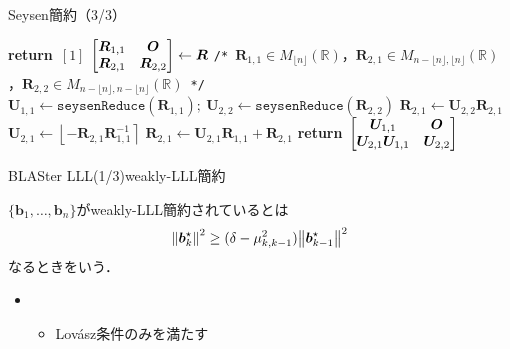 \documentclass[12pt,aspectratio=169,table,dvipdfmx, leqno]{beamer}
\renewcommand{\Comment}[1]{\quad\texttt{/*}~#1~\texttt{*/}}
\newcommand{\round}[1]{\left\lfloor #1 \right\rceil}
\begin{document}
\begin{frame}{Seysen簡約（3/3）}
\begin{algorithm}[H]
    \footnotesize
    \begin{algorithmic}[1]
        \caption{\footnotesize Seysen簡約\cite{DPS25}}
        \label{alg_seysen}
            \State \textbf{return}~$[1]$
        \EndIf
        \State $\mqty[\bm{R}_{1, 1} & \bm{O}\\ \bm{R}_{2, 1} & \bm{R}_{2, 2}]\gets \bm{R}$ \Comment{$\bm{R}_{1, 1}\in M_{\lfloor n\rfloor}(\mathbb{R})$，$\bm{R}_{2, 1}\in M_{n-\lfloor n\rfloor, \lfloor n\rfloor}(\mathbb{R})$，$\bm{R}_{2, 2}\in M_{n-\lfloor n\rfloor, n-\lfloor n\rfloor}(\mathbb{R})$}
        \State $\bm{U}_{1, 1}\gets \texttt{seysenReduce}(\bm{R}_{1, 1});~\bm{U}_{2, 2}\gets \texttt{seysenReduce}(\bm{R}_{2, 2})$
        \State $\bm{R}_{2, 1}\gets \bm{U}_{2, 2}\bm{R}_{2, 1}$
        \State $\bm{U}_{2, 1}\gets \round{-\bm{R}_{2, 1}\bm{R}_{1, 1}^{-1}}$
        \State $\bm{R}_{2, 1}\gets \bm{U}_{2, 1}\bm{R}_{1, 1}+\bm{R}_{2, 1}$
        \State \textbf{return}~$\mqty[\bm{U}_{1, 1} & \bm{O}\\ \bm{U}_{2, 1}\bm{U}_{1, 1} & \bm{U}_{2, 2}]$
    \end{algorithmic}
\end{algorithm}
\end{frame}

\begin{frame}{BLASter LLL(1/3)}{weakly-LLL簡約}
\begin{definition}
    $\{\bm{b}_1,\ldots,\bm{b}_n\}$がweakly-LLL簡約されているとは
    \[
        \norm{\bm{b}_k^\star}^2\ge (\delta - \mu_{k, k-1}^2)\norm{\bm{b}_{k-1}^\star}^2
    \]
    なるときをいう．
    \begin{itemize}
        \item[\quad]
        \begin{itemize}
            \item Lov\'asz条件のみを満たす
        \end{itemize}
    \end{itemize}
\end{definition}
\end{frame}
\end{document}
